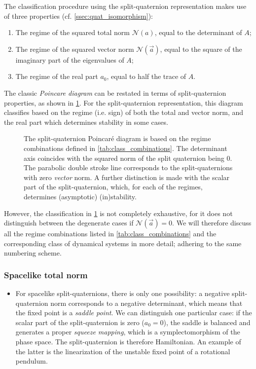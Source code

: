 The classification procedure using the split-quaternion representation makes use of three properties (cf. \cref{ssec:quat_isomorphism}): 
\begin{enumerate}[label=(\roman*), align=left, leftmargin=1.5cm]
    \item The regime of the squared total norm $\mathscr{N}(a)$, equal to the determinant of $A$;
    \item The regime of the squared vector norm $\mathscr{N}(\vec{a})$, equal to the square of the imaginary part of the eigenvalues of $A$;
    \item The regime of the real part $a_0$, equal to half the trace of $A$.
\end{enumerate}
The classic \emph{Poincare diagram} can be restated in terms of split-quaternion properties, as shown in \cref{fig:poincare_diagram}. For the split-quaternion representation, this diagram classifies based on the regime (i.e. sign) of both the total and vector norm, and the real part which determines stability in some cases.

\begin{figure}[ht!]
    \centering
    
    \caption{The split-quaternion Poincaré diagram is based on the regime combinations defined in \cref{tab:class_combinations}. The determinant axis coincides with the squared norm of the split quaternion being 0. The parabolic double stroke line corresponds to the split-quaternions with zero \emph{vector} norm. 
    A further distinction is made with the scalar part of the split-quaternion, which, for each of the regimes, determines (asymptotic) (in)stability.}
    \label{fig:poincare_diagram}
\end{figure}

However, the classification in \cref{fig:poincare_diagram} is not completely exhaustive, for it does not distinguish between the degenerate cases if $\mathscr{N}(\vec{a}) = 0$.
We will therefore discuss all the regime combinations listed in \cref{tab:class_combinations} and the corresponding class of dynamical systems in more detail; adhering to the same numbering scheme.

\subsubsection*{Spacelike total norm}
    \begin{itemize}
        \item[\circled{1}] For spacelike split-quaternions, there is only one possibility: a negative split-quaternion norm corresponds to a negative determinant, which means that the fixed point is a \emph{saddle point}. We can distinguish one particular case: if the scalar part of the split-quaternion is zero (\(a_0 = 0\)), the saddle is balanced and generates a proper \emph{squeeze mapping}, which is a symplectomorphism of the phase space. The split-quaternion is therefore Hamiltonian. An example of the latter is the linearization of the unstable fixed point of a rotational pendulum.
    \end{itemize}

